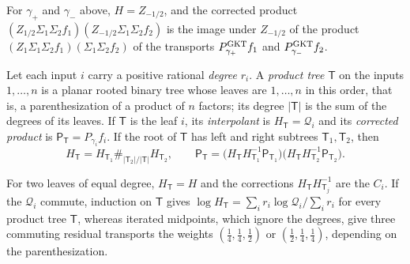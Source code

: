 For $\gamma_+$ and $\gamma_-$ above, $H=Z_{-1/2}$, and
the corrected product $(Z_{1/2}\Sigma_1\Sigma_2f_1)(Z_{-1/2}\Sigma_1\Sigma_2f_2)$
is the image under $Z_{-1/2}$ of the product
$(Z_1\Sigma_1\Sigma_2f_1)(\Sigma_1\Sigma_2f_2)$ of the transports
$P^{\mathrm{GKT}}_{\gamma_+}f_1$ and $P^{\mathrm{GKT}}_{\gamma_-}f_2$.

\begin{definition}
\label{def:corrected-product}
Let each input $i$ carry a positive rational \emph{degree} $r_i$.  A
\emph{product tree} $\mathsf T$ on the inputs $1,\dots,n$ is a planar
rooted binary tree whose leaves are $1,\dots,n$ in this order, that is, a
parenthesization of a product of $n$ factors; its degree $|\mathsf T|$ is the
sum of the degrees of its leaves.  If $\mathsf T$ is the leaf $i$, its
\emph{interpolant} is $H_{\mathsf T}=\mathcal Q_i$ and its \emph{corrected
product} is $\mathsf P_{\mathsf T}=P_{\gamma_i}f_i$.  If the root of
$\mathsf T$ has left and right subtrees $\mathsf T_1,\mathsf T_2$, then
\[
 H_{\mathsf T}=H_{\mathsf T_1}\mathbin{\#_{|\mathsf T_2|/|\mathsf T|}}H_{\mathsf T_2},
 \qquad
 \mathsf P_{\mathsf T}
 =\bigl(H_{\mathsf T}H_{\mathsf T_1}^{-1}\mathsf P_{\mathsf T_1}\bigr)
  \bigl(H_{\mathsf T}H_{\mathsf T_2}^{-1}\mathsf P_{\mathsf T_2}\bigr).
\]
\end{definition}

For two leaves of equal degree, $H_{\mathsf T}=H$ and the corrections
$H_{\mathsf T}H_{\mathsf T_j}^{-1}$ are the $C_i$.  If the $\mathcal Q_i$
commute, induction on $\mathsf T$ gives
$\log H_{\mathsf T}=\sum_ir_i\log\mathcal Q_i\big/\sum_ir_i$ for every
product tree $\mathsf T$, whereas iterated midpoints, which ignore the
degrees, give three commuting residual transports the weights
$(\frac14,\frac14,\frac12)$ or $(\frac12,\frac14,\frac14)$, depending on the
parenthesization.

